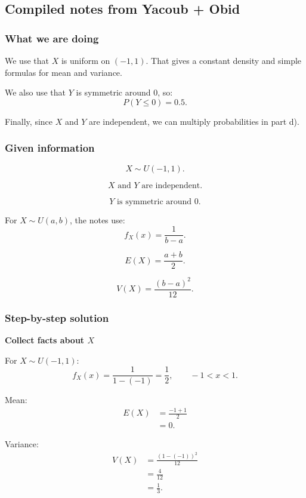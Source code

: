 \documentclass[10pt]{article}
\begin{document}
\subsection*{Compiled notes from Yacoub + Obid}

\subsubsection*{What we are doing}

We use that \(X\) is uniform on \((-1,1)\).
That gives a constant density and simple formulas
for mean and variance.

We also use that \(Y\) is symmetric around \(0\), so:
\[
P(Y\le 0)=0.5.
\]

Finally, since \(X\) and \(Y\) are independent, we can
multiply probabilities in part d).

\subsubsection*{Given information}

\[
X\sim U(-1,1).
\]

\[
X \text{ and } Y
\text{ are independent.}
\]

\[
Y \text{ is symmetric around }0.
\]

For \(X\sim U(a,b)\), the notes use:
\[
f_X(x)=\frac{1}{b-a}.
\]

\[
E(X)=\frac{a+b}{2}.
\]

\[
V(X)=\frac{(b-a)^2}{12}.
\]

\subsubsection*{Step-by-step solution}

\textbf{Collect facts about \(X\)}

For \(X\sim U(-1,1)\):
\[
f_X(x)
=
\frac{1}{1-(-1)}
=
\frac12,
\qquad -1<x<1.
\]

Mean:
\begin{align*}
E(X)
&=
\frac{-1+1}{2}
\\[2mm]
&=0.
\end{align*}

Variance:
\begin{align*}
V(X)
&=
\frac{(1-(-1))^2}{12}
\\[2mm]
&=
\frac{4}{12}
\\[2mm]
&=
\frac13.
\end{align*}
\end{document}
